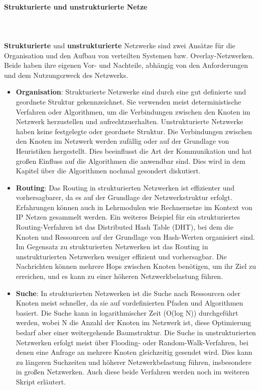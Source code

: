 \documentclass[../vs-script-first-v01.tex]{subfiles}
\begin{document}
\paragraph{\textbf{Strukturierte} und \textbf{unstrukturierte} Netze}\mbox{}\\\\
\textbf{Strukturierte} und \textbf{unstrukturierte} Netzwerke sind zwei Ansätze für die Organisation und den Aufbau von verteilten Systemen bzw. Overlay-Netzwerken. Beide haben ihre eigenen Vor- und Nachteile, abhängig von den Anforderungen und dem Nutzungszweck des Netzwerks.
\begin{itemize} 
\item \textbf{Organisation}: Strukturierte Netzwerke sind durch eine gut definierte und geordnete Struktur gekennzeichnet. Sie verwenden meist deterministische Verfahren oder Algorithmen, um die Verbindungen zwischen den Knoten im Netzwerk herzustellen und aufrechtzuerhalten. Unstrukturierte Netzwerke haben keine festgelegte oder geordnete Struktur. Die Verbindungen zwischen den Knoten im Netzwerk werden zufällig oder auf der Grundlage von Heuristiken hergestellt. Dies beeinflusst die Art der Kommunikation und hat großen Einfluss auf die Algorithmen die anwendbar sind. Dies wird in dem Kapitel über die Algorithmen nochmal gesondert diskutiert.
\item  \textbf{Routing}: Das Routing in strukturierten Netzwerken ist effizienter und vorhersagbarer, da es auf der Grundlage der Netzwerkstruktur erfolgt. Erfahrungen können auch in Lehrmodulen wie Rechnernetze im Kontext von IP Netzen gesammelt werden. Ein weiteres Beispiel für ein strukturiertes Routing-Verfahren ist das Distributed Hash Table (DHT), bei dem die Knoten und Ressourcen auf der Grundlage von Hash-Werten organisiert sind. Im Gegensatz zu strukturierten Netzwerken ist das Routing in unstrukturierten Netzwerken weniger effizient und vorhersagbar. Die Nachrichten können mehrere Hops zwischen Knoten benötigen, um ihr Ziel zu erreichen, und es kann zu einer höheren Netzwerkbelastung führen.
\item  \textbf{Suche}: In strukturierten Netzwerken ist die Suche nach Ressourcen oder Knoten meist schneller, da sie auf vordefinierten Pfaden und Algorithmen basiert. Die Suche kann in logarithmischer Zeit (O(log N)) durchgeführt werden, wobei N die Anzahl der Knoten im Netzwerk ist, diese Optimierung bedarf aber einer weitergehende Baumstruktur. Die Suche in unstrukturierten Netzwerken erfolgt meist über Flooding- oder Random-Walk-Verfahren, bei denen eine Anfrage an mehrere Knoten gleichzeitig gesendet wird. Dies kann zu längeren Suchzeiten und höherer Netzwerkbelastung führen, insbesondere in großen Netzwerken. Auch diese beide Verfahren werden noch im weiteren Skript erläutert. 

\end{itemize}
\end{document}
